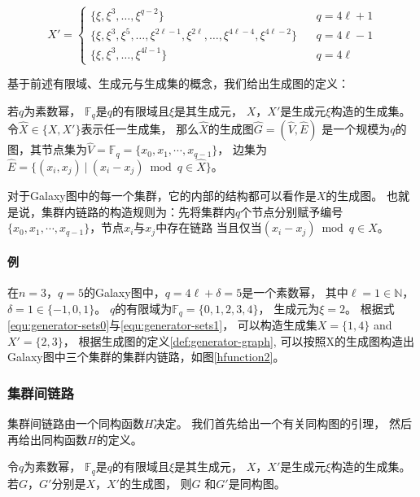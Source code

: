 \begin{equation}\label{equ:generator-sets1}
  X'=
  \begin{cases}
    \{\xi,\xi^3,\ldots,\xi^{q-2}\} & q=4 \ell+1 \\
    \{\xi,\xi^3,\xi^5,\ldots,\xi^{2\ell-1}, \xi^{2\ell},\ldots,\xi^{4\ell-4},\xi^{4\ell-2}\}\ \ \ \  & q=4 \ell-1 \\
    \{\xi,\xi^3,\ldots,\xi^{4l-1}\} & q=4 \ell
  \end{cases}
\end{equation}

基于前述有限域、生成元与生成集的概念，我们给出生成图的定义：
\begin{definition}\label{def:generator-graph}
  若$q$为素数幂，
  $\mathds{F}_q$是$q$的有限域且$\xi$是其生成元，
  $X$，$X'$是生成元$\xi$构造的生成集。
  令$\hat{X} \in \{X, X'\}$表示任一生成集，
  那么$\hat{X}$的生成图$\hat{G}=(\hat{V}, \hat{E})$
  是一个规模为$q$的图，其节点集为$\hat{V} = \mathds{F}_q = \{x_{0}, x_{1}, \cdots, x_{q-1}\}$，
  边集为$\hat{E} = \{(x_i, x_j)\ |\ (x_i - x_j) \bmod q \in \hat{X}\}$。
\end{definition}

对于Galaxy图中的每一个集群，它的内部的结构都可以看作是$X$的生成图。
也就是说，集群内链路的构造规则为：先将集群内$q$个节点分别赋予编号
$\{x_{0}, x_{1}, \cdots, x_{q-1}\}$，节点$x_i$与$x_j$中存在链路
当且仅当$(x_i - x_j) \bmod q \in X$。

\paragraph{例} 在$n=3$，$q=5$的Galaxy图中，$q=4\ell+\delta=5$是一个素数幂，
其中$\ell=1 \in \mathds{N}$，$\delta=1 \in \{-1,0,1\}$。
$q$的有限域为$\mathds{F}_q = \{0,1,2,3,4\}$，
生成元为$\xi = 2$。
根据式\eqref{equ:generator-sets0}与\eqref{equ:generator-sets1}，
可以构造生成集$X=\{1,4\}$ and $X'=\{2,3\}$，
根据生成图的定义\ref{def:generator-graph},
可以按照X的生成图构造出Galaxy图中三个集群的集群内链路，如图\ref{hfunction2}。

\subsubsection{集群间链路}

集群间链路由一个同构函数$H$决定。
我们首先给出一个有关同构图的引理，
然后再给出同构函数$H$的定义。

\begin{lemma}\label{thm:generator-graph}
  令$q$为素数幂，
  $\mathds{F}_q$是$q$的有限域且$\xi$是其生成元，
  $X$，$X'$是生成元$\xi$构造的生成集。
  若$G$，$G'$分别是$X$，$X'$的生成图，
  则$G$ 和$G'$是同构图。
\end{lemma}

